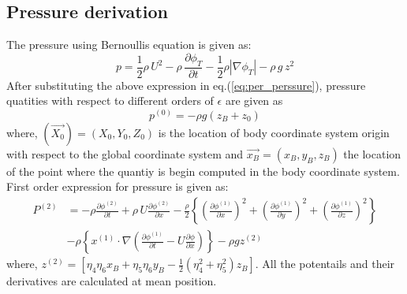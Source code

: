 \subsection{Pressure derivation}
The pressure using Bernoullis equation is given as:
\begin{equation}
    p = \frac{1}{2}\rho\,U^2 - \rho\,\frac{\partial \phi_T}{\partial t} - \frac{1}{2}\rho |\nabla\phi_T|-\rho\,g\,z^2
\end{equation} 
After substituting the above expression in eq.(\ref{eq:per_perssure}), pressure quatities with respect 
to different orders of $\epsilon$ are given as 
\begin{equation}
    p^{(0)} = - \rho g(z_B + z_0)
\end{equation}
where, $(\vec{X_0}) = (X_0, Y_0, Z_0)$ is the location of body coordinate system origin with respect to the global 
coordinate system and $\vec{x_B}=(x_B, y_B, z_B)$ the location of the point where the quantiy is begin computed in the body coordinate
system.
First order expression for pressure is given as:
\begin{align}
    P^{(2)} &= -\rho\frac{\partial \phi^{(2)}}{\partial t} + \rho\,U\frac{\partial \phi^{(2)}}{\partial x} -\frac{\rho}{2}
    \left\{\left(\frac{\partial \phi^{(1)}}{\partial x}\right)^2 + \left(\frac{\partial \phi^{(1)}}{\partial y}\right)^2 + 
    \left(\frac{\partial \phi^{(1)}}{\partial z}\right)^2\right\} \\ \nonumber
    &-\rho\left\{x^{(1)}\cdot\nabla \left(\frac{\partial \phi^{(1)}}{\partial t} - U\frac{\partial \phi}{\partial x}\right)\right\}
    - \rho g z^{(2)}
\end{align}
where, $z^{(2)} = [\eta_4\eta_6 x_B + \eta_5\eta_6 y_B - \frac{1}{2}(\eta_4^2 + \eta_5^2)z_B]$. All the potentails and 
their derivatives are calculated at mean position.
